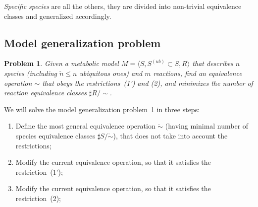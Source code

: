 \documentclass[9pt]{article}
\newcounter{pbm}
\begin{document}
\emph{Specific species} are all the others, they are divided into non-trivial equivalence classes and generalized accordingly.  

\subsection*{Model generalization problem}
\newtheorem{p0}[pbm]{Problem}
\begin{p0}
Given a metabolic model $M=\langle S, S^{(ub)} \subset S, R \rangle$ that describes $n$ species (including $\breve{n} \leq n$ ubiquitous ones) and $m$ reactions, find an equivalence operation $\sim$ that obeys the restrictions~(1') and (2), and minimizes the number of reaction equivalence classes $\sharp R/\sim$.
\end{p0}

We will solve the model generalization problem~1 in three steps:
\begin{enumerate}
\item Define the most general equivalence operation $\mathring{\sim}$ (having minimal number of species equivalence classes $\sharp{S/\mathring{\sim}}$), that does not take into account the restrictions;
\item Modify the current equivalence operation, so that it satisfies the restriction~(1');
\item Modify the current equivalence operation, so that it satisfies the restriction~(2);
\end{enumerate}
\end{document}
